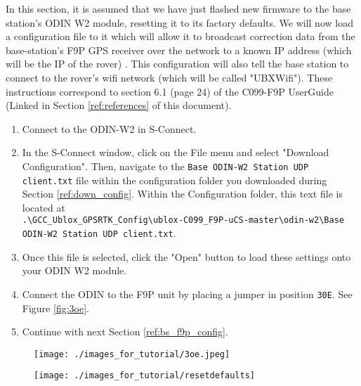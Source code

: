 \documentclass{article}%
\begin{document}
	In this section, it is assumed that we have just flashed new firmware to the base station's ODIN W2 module, resetting it to its factory defaults.  We will now load a configuration file to it which will allow it to broadcast correction data from the base-station's F9P GPS receiver over the network to a known IP address (which will be the IP of the rover) . This configuration will also tell the base station to connect to the rover's wifi network (which will be called "UBXWifi").  These instructions correspond to section 6.1 (page 24) of the C099-F9P UserGuide (Linked in Section \ref{ref:references} of this document).
	\begin{enumerate}
	\item Connect to the ODIN-W2 in S-Connect.
	\item In the S-Connect window, click on the File menu and select "Download Configuration".  Then, navigate to the \texttt{Base ODIN-W2 Station UDP client.txt} file within the configuration folder you downloaded during Section \ref{ref:down_config}.  Within the Configuration folder, this text file is located at\\ \texttt{.\textbackslash GCC\_Ublox\_GPSRTK\_Config\textbackslash ublox-C099\_F9P-uCS-master\textbackslash odin-w2\textbackslash Base ODIN-W2 Station UDP client.txt}.
	\item Once this file is selected, click the "Open" button to load these settings onto your ODIN W2 module.
	\item Connect the ODIN to the F9P unit by placing a jumper in position \texttt{30E}. See Figure \ref{fig:3oe}.
	\item Continue with next Section \ref{ref:bs_f9p_config}.
	\end{enumerate}
	
	\begin{figure}
	\centering
	\begin{minipage}{.5\textwidth}
	  \centering
	  \texttt{[image: ./images\_for\_tutorial/3oe.jpeg]}
	  \label{fig:3oe}
	\end{minipage}%
	\begin{minipage}{.5\textwidth}
	  \centering
	  \texttt{[image: ./images\_for\_tutorial/resetdefaults]}
	  \label{fig:resetdefaults}
	\end{minipage}
	\end{figure}
	
\end{document}
